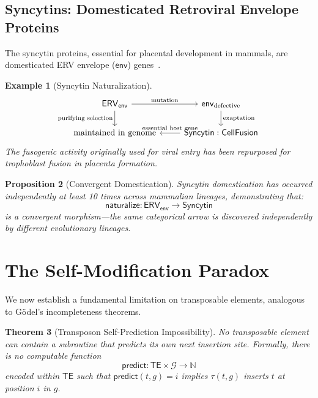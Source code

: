 \documentclass[12pt,a4paper]{article}
\newtheorem{theorem}{Theorem}[section]
\newtheorem{proposition}[theorem]{Proposition}
\newtheorem{example}[theorem]{Example}
\newcommand{\Genome}{\mathcal{G}}
\newcommand{\TE}{\mathsf{TE}}
\newcommand{\ERV}{\mathsf{ERV}}
\begin{document}
\subsection{Syncytins: Domesticated Retroviral Envelope Proteins}

The syncytin proteins, essential for placental development in mammals, are domesticated
ERV envelope ($\mathsf{env}$) genes~\cite{mi2000}.

\begin{example}[Syncytin Naturalization]\label{ex:syncytin}
\[
\begin{tikzcd}
  \ERV_{\mathsf{env}} \arrow[r, "\text{mutation}"] \arrow[d, "\text{purifying selection}"'] &
  \mathsf{env}_{\mathrm{defective}} \arrow[d, "\text{exaptation}"] \\
  \text{maintained in genome} &
  \mathsf{Syncytin} : \mathsf{CellFusion} \arrow[l, "\text{essential host gene}"']
\end{tikzcd}
\]
The fusogenic activity originally used for viral entry has been repurposed for
trophoblast fusion in placenta formation.
\end{example}

\begin{proposition}[Convergent Domestication]\label{prop:convergent}
Syncytin domestication has occurred independently at least 10 times across mammalian
lineages, demonstrating that:
\[
  \mathsf{naturalize} : \ERV_{\mathsf{env}} \to \mathsf{Syncytin}
\]
is a \emph{convergent morphism}---the same categorical arrow is discovered independently
by different evolutionary lineages.
\end{proposition}


\section{The Self-Modification Paradox}\label{sec:goedel}

We now establish a fundamental limitation on transposable elements, analogous to
G\"odel's incompleteness theorems.

\begin{theorem}[Transposon Self-Prediction Impossibility]\label{thm:goedel}
No transposable element can contain a subroutine that predicts its own next insertion site.
Formally, there is no computable function
\[
  \mathsf{predict} : \TE \times \Genome \to \mathbb{N}
\]
encoded within $\TE$ such that $\mathsf{predict}(t, g) = i$ implies $\tau(t, g)$
inserts $t$ at position $i$ in $g$.
\end{theorem}
\end{document}
